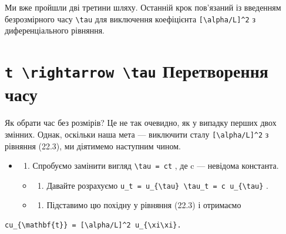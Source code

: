 \documentclass[
  ukrainian,
]{article}
\providecommand{\tightlist}{%
  \setlength{\itemsep}{0pt}\setlength{\parskip}{0pt}}
\begin{document}
Ми вже пройшли дві третини шляху. Останній крок пов'язаний із введенням
безрозмірного часу \texttt{\textbackslash{}tau} для виключення
коефіцієнта \texttt{{[}\textbackslash{}alpha/L{]}\^{}2} з
диференціального рівняння.

\section{\texorpdfstring{\texttt{t\ \textbackslash{}rightarrow\ \textbackslash{}tau}
Перетворення
часу}{t \textbackslash rightarrow \textbackslash tau Перетворення часу}}\label{t-rightarrow-tau-ux43fux435ux440ux435ux442ux432ux43eux440ux435ux43dux43dux44f-ux447ux430ux441ux443}

Як обрати час без розмірів? Це не так очевидно, як у випадку перших двох
змінних. Однак, оскільки наша мета --- виключити сталу
\texttt{{[}\textbackslash{}alpha/L{]}\^{}2} з рівняння (22.3), ми
діятимемо наступним чином.

\begin{itemize}
\item
  \begin{enumerate}
  \def\labelenumi{\arabic{enumi}.}
  \tightlist
  \item
    Спробуємо замінити вигляд \texttt{\textbackslash{}tau\ =\ ct} , де c
    --- невідома константа.
  \end{enumerate}

  \begin{itemize}
  \tightlist
  \item
    \begin{enumerate}
    \def\labelenumi{\arabic{enumi}.}
    \setcounter{enumi}{1}
    \tightlist
    \item
      Давайте розрахуємо
      \texttt{u\_t\ =\ u\_\{\textbackslash{}tau\}\ \textbackslash{}tau\_t\ =\ c\ u\_\{\textbackslash{}tau\}}
      .
    \end{enumerate}
  \item
    \begin{enumerate}
    \def\labelenumi{\arabic{enumi}.}
    \setcounter{enumi}{2}
    \tightlist
    \item
      Підставимо цю похідну у рівняння (22.3) і отримаємо
    \end{enumerate}
  \end{itemize}
\end{itemize}

\begin{verbatim}
cu_{\mathbf{t}} = [\alpha/L]^2 u_{\xi\xi}.
\end{verbatim}
\end{document}
